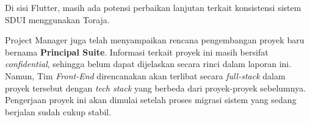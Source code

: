 Di sisi Flutter, masih ada potensi perbaikan lanjutan terkait konsistensi
sistem SDUI menggunakan Toraja.

Project Manager juga telah menyampaikan rencana pengembangan proyek baru
bernama \textbf{Principal Suite}. Informasi terkait proyek ini masih bersifat
\textit{confidential}, sehingga belum dapat dijelaskan secara rinci dalam
laporan ini. Namun, Tim \textit{Front-End} direncanakan akan terlibat secara
\textit{full-stack} dalam proyek tersebut dengan \textit{tech stack} yang
berbeda dari proyek-proyek sebelumnya. Pengerjaan proyek ini akan dimulai
setelah proses migrasi sistem yang sedang berjalan sudah cukup stabil.